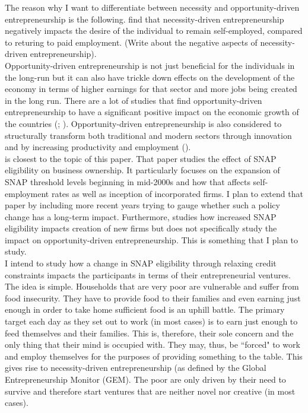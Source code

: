\documentclass[12pt]{article}
\begin{document}
\begin{titlingpage}
The reason why I want to differentiate between necessity and opportunity-driven entrepreneurship is the following. \cite{kautonen2010impact} find that necessity-driven entrepreneurship negatively impacts the desire of the individual to remain self-employed, compared to returing to paid employment.  (Write about the negative aspects of necessity-driven entrepreneurship). \\

Opportunity-driven entrepreneurship is not just beneficial for the individuals in the long-run but it can also have trickle down effects on the development of the economy in terms of higher earnings for that sector and more jobs being created in the long run. There are a lot of studies that find opportunity-driven entrepreneurship to have a significant positive impact on the economic growth of the countries (\cite{rodrigues2018impact}; \cite{stoica2020nexus}). Opportunity-driven entrepreneurship is also considered to structurally transform both traditional and modern sectors through innovation and by increasing productivity and employment (\cite{gries2010entrepreneurship}). \\



\cite{olds2016food} is closest to the topic of this paper. That paper studies the effect of SNAP eligibility on business ownership. It particularly focuses on the expansion of SNAP threshold levels beginning in mid-2000s and how that affects self-employment rates as well as inception of incorporated firms. I plan to extend that paper by including more recent years trying to gauge whether such a policy change has a long-term impact. Furthermore, \cite{olds2016food} studies how increased SNAP eligibility impacts creation of new firms but does not specifically study the impact on opportunity-driven entrepreneurship. This is something that I plan to study.  \\

I intend to study how a change in SNAP eligibility through relaxing credit constraints impacts the participants in terms of their entrepreneurial ventures. The idea is simple. Households that are very poor are vulnerable and suffer from food insecurity. They have to provide food to their families and even earning just enough in order to take home sufficient food is an uphill battle. The primary target each day as they set out to work (in most cases) is to earn just enough to feed themselves and their families. This is, therefore, their sole concern and the only thing that their mind is occupied with. They may, thus, be ``forced" to work and employ themselves for the purposes of providing something to the table. This gives rise to necessity-driven entrepreneurship (as defined by the Global Entrepreneurship Monitor (GEM). The poor are only driven by their need to survive and therefore start ventures that are neither novel nor creative (in most cases). \\


\end{titlingpage}
\end{document}
